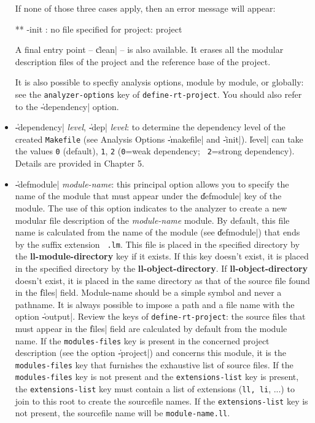\begin{itemize}
If none of those three cases apply, then an error message will appear:

\BeginLL
        ** -init : no file specified for project: project
\EndLL

A final entry point -- \|clean| -- is also available.  It erases all the modular description files of the project and the reference base of the project.

It is also possible to specfiy analysis options, module by module, or globally:  see the {\tt analyzer-options} key of {\tt define-rt-project}.
You should also refer to the \|-dependency| option.

\item {\Large \|-dependency| {\em level}, \|-dep| {\em level}}: to determine the dependency level of the created {\tt Makefile} (see Analysis Options \|-makefile| and \|-init|).  \|level| can take the values {\tt 0} (default), {\tt 1}, {\tt 2} ({\tt 0}=weak dependency; {\tt
2}=strong dependency).  Details are provided in Chapter 5.

\item {\Large \|-defmodule| {\em module-name}}: this principal option allows you to specify the name of the module that must appear under the \|defmodule| key of the module.  The use of this option indicates to the analyzer to create a new modular file description of the {\em
module-name} module. 
By default, this file name is calculated from the name of the module (see \|defmodule|) that ends by the suffix extension {\tt
.lm}.
This file is placed in the specified directory by the {\bf ll-module-directory} key if it exists.  If this key doesn't exist, it is placed in the specified directory by the {\bf ll-object-directory}.  If {\bf ll-object-directory} doesn't exist, it is placed in the same directory as that of the source file found in the \|files| field.  Module-name should be a simple symbol and never a pathname.  It is always possible to impose a path and a file name with the option \|-output|.  
Review the keys of {\tt define-rt-project}:
the source files that must appear in the \|files| field are calculated by default from the module name.  If the {\tt modules-files} key is present in the concerned project description (see the option \|-project|) and concerns this module, it is the {\tt modules-files} key that furnishes the exhaustive list of source files.  If the {\tt modules-files} key is not present and the {\tt extensions-list} key is present, the {\tt extensions-list} key must contain a list of extensions ({\tt ll, li}, ...) to join to this root to create the sourcefile names.  If the {\tt extensions-list} key is not present, the sourcefile name will be {\tt module-name.ll}.


\end{itemize}
